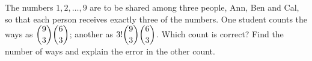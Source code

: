 The numbers $1,2,\dots,9$ are to be shared among three people, Ann, Ben and Cal, so that each person receives exactly three of the numbers. One student counts the ways as $\dbinom93\dbinom63$; another as $3!\dbinom93\dbinom63$. Which count is correct? Find the number of ways and explain the error in the other count.
